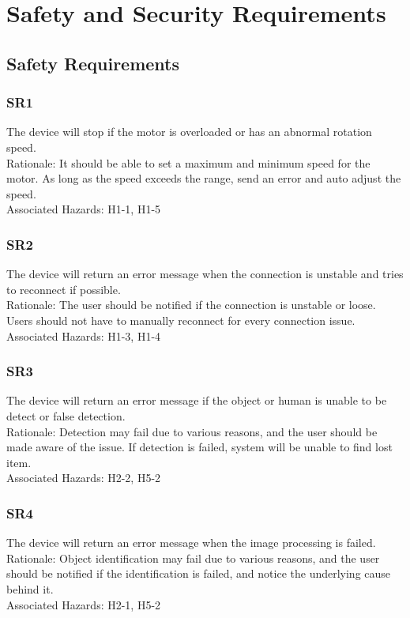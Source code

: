 \documentclass{article}
\begin{document}
\section{Safety and Security Requirements}
\subsection{Safety Requirements}
\subsubsection{SR1}
The device will stop if the motor is overloaded or has an abnormal rotation speed.\\
Rationale: It should be able to set a maximum and minimum speed for the motor. As long as the speed exceeds the range, send an error and auto adjust the speed.\\
Associated Hazards: H1-1, H1-5
\subsubsection{SR2}
The device will return an error message when the connection is unstable and tries to reconnect if possible.\\
Rationale: The user should be notified if the connection is unstable or loose. Users should not have to manually reconnect for every connection issue.\\
Associated Hazards: H1-3, H1-4
\subsubsection{SR3}
The device will return an error message if the object or human is unable to be detect or false detection.\\
Rationale: Detection may fail due to various reasons, and the user should be made aware of the issue. If detection is failed, system will be unable to find lost item.\\
Associated Hazards: H2-2, H5-2
\subsubsection{SR4}
The device will return an error message when the image processing is failed.\\
Rationale: Object identification may fail due to various reasons, and the user should be notified if the identification is failed, and notice the underlying cause behind it.\\
Associated Hazards: H2-1, H5-2
\end{document}
